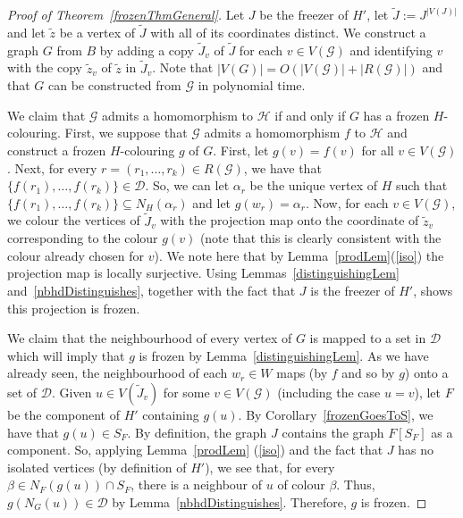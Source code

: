 \documentclass[11 pt]{amsart}
\theoremstyle{definition}
\theoremstyle{case}
\numberwithin{equation}{section}
\begin{document}
\begin{proof}[Proof of Theorem~\ref{frozenThmGeneral}]
Let $J$ be the freezer of $H'$, let $\tilde{J}:=J^{|V(J)|}$ and let $\tilde{z}$ be a vertex of $\tilde{J}$ with all of its coordinates distinct. We construct a graph $G$ from $B$ by adding a copy $\tilde{J}_v$ of $\tilde{J}$ for each $v\in V(\mathcal{G})$ and identifying $v$ with the copy $\tilde{z}_v$ of $\tilde{z}$ in $\tilde{J}_v$. Note that $|V(G)|=O\left(|V(\mathcal{G})| + \left|R(\mathcal{G})\right|\right)$ and that $G$ can be constructed from $\mathcal{G}$ in polynomial time. 

We claim that $\mathcal{G}$ admits a homomorphism to $\mathcal{H}$ if and only if $G$ has a frozen $H$-colouring. First, we suppose that $\mathcal{G}$ admits a homomorphism $f$ to $\mathcal{H}$ and construct a frozen $H$-colouring $g$ of $G$. First, let $g(v)=f(v)$ for all $v\in V(\mathcal{G})$. Next, for every $r = (r_1,\dots, r_k)\in R(\mathcal{G})$, we have that $\{f(r_1),\dots,f(r_k)\}\in \mathcal{D}$. So, we can let $\alpha_r$ be the unique vertex of $H$ such that $\{f(r_1),\dots,f(r_k)\}\subseteq N_H(\alpha_r)$ and let $g(w_r)=\alpha_r$. Now, for each $v\in V(\mathcal{G})$, we colour the vertices of $\tilde{J}_v$ with the projection map onto the coordinate of $\tilde{z}_v$ corresponding to the colour $g(v)$ (note that this is clearly consistent with the colour already chosen for $v$). We note here that by Lemma~\ref{prodLem}(\ref{iso}) the projection map is locally surjective.  Using Lemmas~\ref{distinguishingLem} and~\ref{nbhdDistinguishes}, together with the fact that $J$ is the freezer of $H'$, shows this projection is frozen.

We claim that the neighbourhood of every vertex of $G$ is mapped to a set in $\mathcal{D}$ which will imply that $g$ is frozen by Lemma~\ref{distinguishingLem}. As we have already seen, the neighbourhood of each $w_r\in W$ maps (by $f$ and so by $g$) onto a set of $\mathcal{D}$. Given $u\in V(\tilde{J}_v)$ for some $v\in V(\mathcal{G})$ (including the case $u=v$), let $F$ be the component of $H'$ containing $g(u)$. By Corollary~\ref{frozenGoesToS}, we have that $g(u)\in S_F$. By definition, the graph $J$ contains the graph $F[S_F]$ as a component. So, applying Lemma~\ref{prodLem} (\ref{iso}) and the fact that $J$ has no isolated vertices (by definition of $H'$), we see that, for every $\beta\in N_F(g(u))\cap S_F$, there is a neighbour of $u$ of  colour $\beta$. Thus,  $g(N_G(u))\in \mathcal{D}$ by Lemma~\ref{nbhdDistinguishes}. Therefore, $g$ is frozen. 


\end{proof}
\end{document}
